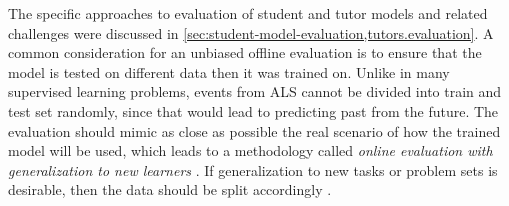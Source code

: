 
The specific approaches to evaluation of student and tutor models and related challenges
were discussed in \cref{sec:student-model-evaluation,tutors.evaluation}.
A common consideration for an unbiased offline evaluation is to ensure that
the model is tested on different data then it was trained on.
Unlike in many supervised learning problems, events from ALS
cannot be divided into train and test set randomly, since that would lead
to predicting past from the future. %
The evaluation should mimic as close as possible the real scenario of how the
trained model will be used, which leads to a methodology called \emph{online
evaluation with generalization to new learners} \cite{pelanek-learner-modeling}.
If generalization to new tasks or problem sets %
is desirable, then the data should be split accordingly \cite{student-models-review-2012}.


%

